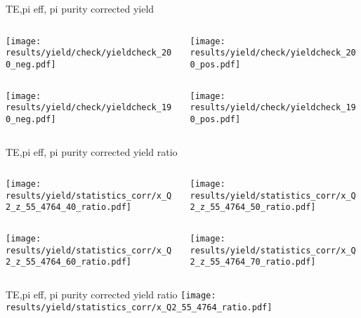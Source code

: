 \begin{frame}{TE,pi eff, pi purity corrected yield}
\begin{columns}
\begin{column}[T]{0.5\textwidth}
\texttt{[image: results/yield/check/yieldcheck\_200\_neg.pdf]}
\end{column}
\begin{column}[T]{0.5\textwidth}
\texttt{[image: results/yield/check/yieldcheck\_200\_pos.pdf]}
\end{column}
\end{columns}
\begin{columns}
\begin{column}[T]{0.5\textwidth}
\texttt{[image: results/yield/check/yieldcheck\_190\_neg.pdf]}
\end{column}
\begin{column}[T]{0.5\textwidth}
\texttt{[image: results/yield/check/yieldcheck\_190\_pos.pdf]}
\end{column}
\end{columns}
\end{frame}
\begin{frame}{TE,pi eff, pi purity corrected yield ratio}
\begin{columns}
\begin{column}[T]{0.5\textwidth}
\texttt{[image: results/yield/statistics\_corr/x\_Q2\_z\_55\_4764\_40\_ratio.pdf]}
\end{column}
\begin{column}[T]{0.5\textwidth}
\texttt{[image: results/yield/statistics\_corr/x\_Q2\_z\_55\_4764\_50\_ratio.pdf]}
\end{column}
\end{columns}
\begin{columns}
\begin{column}[T]{0.5\textwidth}
\texttt{[image: results/yield/statistics\_corr/x\_Q2\_z\_55\_4764\_60\_ratio.pdf]}
\end{column}
\begin{column}[T]{0.5\textwidth}
\texttt{[image: results/yield/statistics\_corr/x\_Q2\_z\_55\_4764\_70\_ratio.pdf]}
\end{column}
\end{columns}
\end{frame}
\begin{frame}{TE,pi eff, pi purity corrected yield ratio}
\texttt{[image: results/yield/statistics\_corr/x\_Q2\_55\_4764\_ratio.pdf]}
\end{frame}
